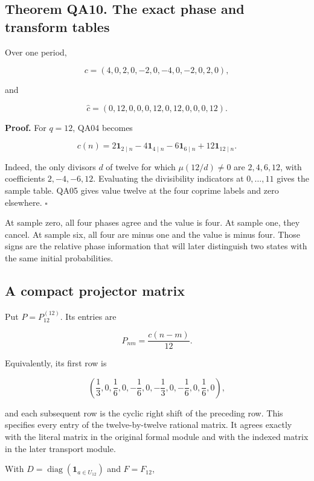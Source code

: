 \hypertarget{theorem-qa10.-the-exact-phase-and-transform-tables}{%
\subsection*{Theorem QA10. The exact phase and transform
tables}\label{theorem-qa10.-the-exact-phase-and-transform-tables}}

Over one period,

\[
c=(4,0,2,0,-2,0,-4,0,-2,0,2,0),
\]

and

\[
\widehat c=(0,12,0,0,0,12,0,12,0,0,0,12).
\]

\textbf{Proof.} For \(q=12\), QA04 becomes

\[
c(n)=2\mathbf1_{2\mid n}-4\mathbf1_{4\mid n}
-6\mathbf1_{6\mid n}+12\mathbf1_{12\mid n}.
\]

Indeed, the only divisors \(d\) of twelve for which \(\mu(12/d)\ne0\)
are \(2,4,6,12\), with coefficients \(2,-4,-6,12\). Evaluating the
divisibility indicators at \(0,\ldots,11\) gives the sample table. QA05
gives value twelve at the four coprime labels and zero elsewhere.
\(\square\)

At sample zero, all four phases agree and the value is four. At sample
one, they cancel. At sample six, all four are minus one and the value is
minus four. Those signs are the relative phase information that will
later distinguish two states with the same initial probabilities.

\hypertarget{a-compact-projector-matrix}{%
\subsection{A compact projector
matrix}\label{a-compact-projector-matrix}}

Put \(P=P_{12}^{(12)}\). Its entries are

\[
P_{nm}=\frac{c(n-m)}{12}.
\]

Equivalently, its first row is

\[
\left(\frac13,0,\frac16,0,-\frac16,0,-\frac13,0,-\frac16,0,\frac16,0\right),
\]

and each subsequent row is the cyclic right shift of the preceding row.
This specifies every entry of the twelve-by-twelve rational matrix. It
agrees exactly with the literal matrix in the original formal module and
with the indexed matrix in the later transport module.

With \(D=\operatorname{diag}(\mathbf1_{a\in U_{12}})\) and \(F=F_{12}\),

